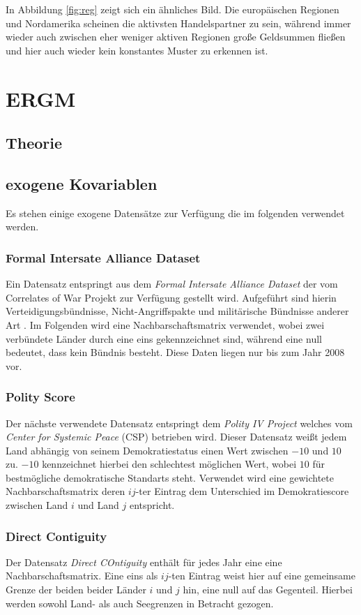 \documentclass[a4paper,ngerman,oneside,titlepage,bibliography=totoc,11pt]{scrreprt}
\begin{document}
In Abbildung \ref{fig:reg} zeigt sich ein ähnliches Bild. Die europäischen Regionen und Nordamerika scheinen die aktivsten Handelspartner zu sein, während immer wieder auch zwischen eher weniger aktiven Regionen große Geldsummen fließen und hier auch wieder kein konstantes Muster zu erkennen ist.  

\chapter{ERGM}
\section{Theorie}
\section{exogene Kovariablen}
Es stehen einige exogene Datensätze zur Verfügung die im folgenden verwendet werden.

\subsection{Formal Intersate Alliance Dataset}
Ein Datensatz entspringt aus dem \emph{Formal Intersate Alliance Dataset} \cite{alliance} der vom Correlates of War Projekt zur Verfügung gestellt wird. Aufgeführt sind hierin Verteidigungsbündnisse, Nicht-Angriffspakte und militärische Bündnisse anderer Art . 
Im Folgenden wird  eine Nachbarschaftsmatrix verwendet, wobei zwei verbündete Länder durch eine eins gekennzeichnet sind, während eine null bedeutet, dass kein Bündnis besteht. Diese Daten liegen nur bis zum Jahr 2008 vor.

\subsection{Polity Score}
Der nächste verwendete Datensatz entspringt dem \emph{Polity IV Project} welches vom \emph{Center for Systemic Peace} (CSP) \cite{polity} betrieben wird. Dieser Datensatz weißt jedem Land abhängig von seinem Demokratiestatus einen Wert zwischen $-10$ und $10$ zu. $-10$ kennzeichnet hierbei den schlechtest möglichen Wert, wobei $10$ für bestmögliche demokratische Standarts steht. Verwendet wird eine gewichtete Nachbarschaftsmatrix deren $ij$-ter Eintrag dem Unterschied im Demokratiescore zwischen Land $i$ und Land $j$ entspricht.

\subsection{Direct Contiguity}
Der Datensatz \emph{Direct COntiguity} enthält für jedes Jahr eine eine Nachbarschaftsmatrix. Eine eins als $ij$-ten Eintrag weist hier auf eine gemeinsame Grenze der beiden beider Länder $i$ und $j$ hin, eine null auf das Gegenteil. Hierbei werden sowohl Land- als auch Seegrenzen in Betracht gezogen.
\end{document}
